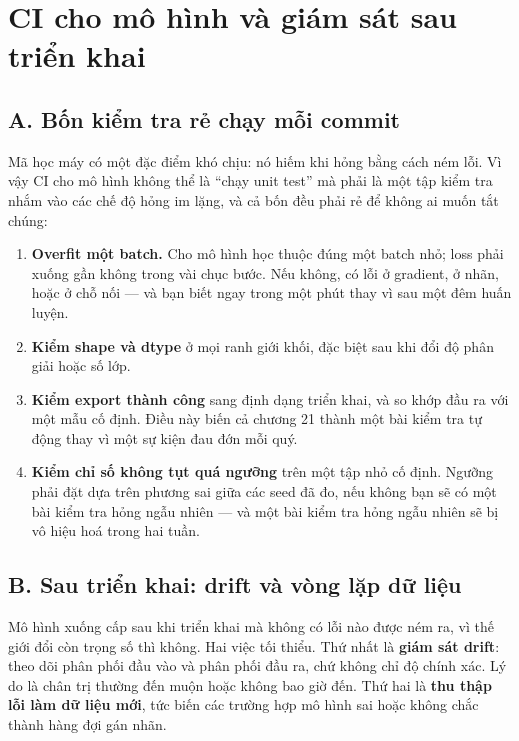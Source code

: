 \documentclass[../../deep_learning.tex]{subfiles}
\begin{document}
\section{CI cho mô hình và giám sát sau triển khai}

\subsection{A. Bốn kiểm tra rẻ chạy mỗi commit}
Mã học máy có một đặc điểm khó chịu: nó hiếm khi hỏng bằng cách ném lỗi. Vì vậy CI cho mô hình không thể là ``chạy unit test'' mà phải là một tập kiểm tra nhắm vào các chế độ hỏng im lặng, và cả bốn đều phải rẻ để không ai muốn tắt chúng:


\begin{enumerate}
\item \textbf{Overfit một batch.} Cho mô hình học thuộc đúng một batch nhỏ; loss phải xuống gần không trong vài chục bước. Nếu không, có lỗi ở gradient, ở nhãn, hoặc ở chỗ nối --- và bạn biết ngay trong một phút thay vì sau một đêm huấn luyện.
\item \textbf{Kiểm shape và dtype} ở mọi ranh giới khối, đặc biệt sau khi đổi độ phân giải hoặc số lớp.
\item \textbf{Kiểm export thành công} sang định dạng triển khai, và so khớp đầu ra với một mẫu cố định. Điều này biến cả chương 21 thành một bài kiểm tra tự động thay vì một sự kiện đau đớn mỗi quý.
\item \textbf{Kiểm chỉ số không tụt quá ngưỡng} trên một tập nhỏ cố định. Ngưỡng phải đặt dựa trên phương sai giữa các seed đã đo, nếu không bạn sẽ có một bài kiểm tra hỏng ngẫu nhiên --- và một bài kiểm tra hỏng ngẫu nhiên sẽ bị vô hiệu hoá trong hai tuần.
\end{enumerate}

\subsection{B. Sau triển khai: drift và vòng lặp dữ liệu}
Mô hình xuống cấp sau khi triển khai mà không có lỗi nào được ném ra, vì thế giới đổi còn trọng số thì không. Hai việc tối thiểu. Thứ nhất là \textbf{giám sát drift}: theo dõi phân phối đầu vào và phân phối đầu ra, chứ không chỉ độ chính xác. Lý do là chân trị thường đến muộn hoặc không bao giờ đến. Thứ hai là \textbf{thu thập lỗi làm dữ liệu mới}, tức biến các trường hợp mô hình sai hoặc không chắc thành hàng đợi gán nhãn.
\end{document}
